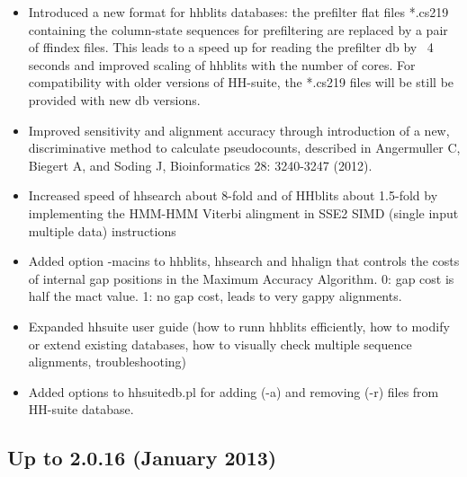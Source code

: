 \documentclass[11pt,a4paper]{article}
\begin{document}
\begin{itemize}
\item Introduced a new format for hhblits databases: the prefilter flat files 
  *.cs219 containing the column-state sequences for prefiltering are replaced
  by a pair of ffindex files. This leads to a speed up for reading the prefilter 
  db by ~4 seconds and improved scaling of hhblits with the number of cores. 
  For compatibility with older versions of HH-suite, the *.cs219 files will 
  be still be provided with new db versions.

\item Improved sensitivity and alignment accuracy through introduction of a new,
  discriminative method to calculate pseudocounts, described in Angermuller C, 
  Biegert A, and Soding J, Bioinformatics 28: 3240-3247 (2012).

\item Increased speed of hhsearch about 8-fold and of HHblits about 1.5-fold by 
  implementing the HMM-HMM Viterbi alingment in SSE2 SIMD (single input 
  multiple data) instructions 

\item Added option -macins to hhblits, hhsearch and hhalign that controls the
  costs of internal gap positions in the Maximum Accuracy Algorithm. 
  0: gap cost is half the mact value. 1: no gap cost, leads to very gappy 
  alignments.

\item Expanded hhsuite user guide (how to runn hhblits efficiently, how to 
  modify or extend existing databases, how to visually check multiple sequence 
  alignments, troubleshooting)

\item Added options to hhsuitedb.pl for adding (-a) and removing (-r) files 
  from HH-suite database.

\end{itemize}

\subsection{Up to 2.0.16 (January 2013)}
\end{document}
